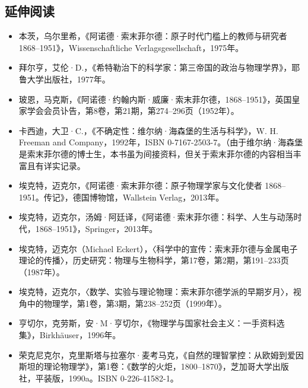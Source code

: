\subsection{延伸阅读}
\begin{itemize}
\item 本茨，乌尔里希，《阿诺德·索末菲尔德：原子时代门槛上的教师与研究者 1868–1951》，Wissenschaftliche Verlagsgesellschaft，1975年。
\item 拜尔亨，艾伦·D.，《希特勒治下的科学家：第三帝国的政治与物理学界》，耶鲁大学出版社，1977年。
\item 玻恩，马克斯，《阿诺德·约翰内斯·威廉·索末菲尔德，1868–1951》，英国皇家学会会员讣告，第8卷，第21期，第274–296页（1952年）。
\item 卡西迪，大卫·C.，《不确定性：维尔纳·海森堡的生活与科学》，W. H. Freeman and Company，1992年，ISBN 0-7167-2503-7。（由于维尔纳·海森堡是索末菲尔德的博士生，本书虽为间接资料，但关于索末菲尔德的内容相当丰富且有详实记录。
\item 埃克特，迈克尔，《阿诺德·索末菲尔德：原子物理学家与文化使者 1868–1951。传记》，德国博物馆，Wallstein Verlag，2013年。
\item 埃克特，迈克尔，汤姆·阿廷译，《阿诺德·索末菲尔德：科学、人生与动荡时代，1868–1951》，Springer，2013年。
\item 埃克特，迈克尔（Michael Eckert），〈科学中的宣传：索末菲尔德与金属电子理论的传播〉，历史研究：物理与生物科学，第17卷，第2期，第191–233页（1987年）。
\item 埃克特，迈克尔，〈数学、实验与理论物理：索末菲尔德学派的早期岁月〉，视角中的物理学，第1卷，第3期，第238–252页（1999年）。
\item 亨切尔，克劳斯，安·M·亨切尔，《物理学与国家社会主义：一手资料选集》，Birkhäuser，1996年。
\item 荣克尼克尔，克里斯塔与拉塞尔·麦考马克，《自然的理智掌控：从欧姆到爱因斯坦的理论物理学》，第1卷：《数学的火炬，1800–1870》，芝加哥大学出版社，平装版，1990a。ISBN 0-226-41582-1。

\end{itemize}
